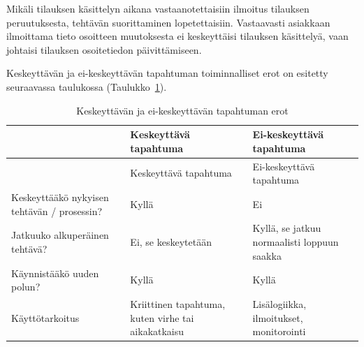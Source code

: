 \documentclass[
  finnish,
  letterpaper,
  DIV=11,
  numbers=noendperiod,
  oneside]{scrreprt}
\begin{document}
Mikäli tilauksen käsittelyn aikana vastaanotettaisiin ilmoitus tilauksen
peruutuksesta, tehtävän suorittaminen lopetettaisiin. Vastaavasti
asiakkaan ilmoittama tieto osoitteen muutoksesta ei keskeyttäisi
tilauksen käsittelyä, vaan johtaisi tilauksen osoitetiedon
päivittämiseen.

Keskeyttävän ja ei-keskeyttävän tapahtuman toiminnalliset erot on
esitetty seuraavassa taulukossa
(Taulukko~\ref{tbl-keskeyttava-tapahtuma}).

\begin{longtable}[]{@{}
  >{\raggedright\arraybackslash}p{}
  >{\raggedright\arraybackslash}p{}
  >{\raggedright\arraybackslash}p{}@{}}
\caption{Keskeyttävän ja ei-keskeyttävän tapahtuman
erot}\label{tbl-keskeyttava-tapahtuma}\tabularnewline
\toprule\noalign{}
\begin{minipage}[b]{\linewidth}\raggedright
\end{minipage} & \begin{minipage}[b]{\linewidth}\raggedright
Keskeyttävä tapahtuma
\end{minipage} & \begin{minipage}[b]{\linewidth}\raggedright
Ei-keskeyttävä tapahtuma
\end{minipage} \\
\midrule\noalign{}
\endfirsthead
\toprule\noalign{}
\begin{minipage}[b]{\linewidth}\raggedright
\end{minipage} & \begin{minipage}[b]{\linewidth}\raggedright
Keskeyttävä tapahtuma
\end{minipage} & \begin{minipage}[b]{\linewidth}\raggedright
Ei-keskeyttävä tapahtuma
\end{minipage} \\
\midrule\noalign{}
\endhead
\bottomrule\noalign{}
\endlastfoot
Keskeyttääkö nykyisen tehtävän / prosessin? & Kyllä & Ei \\
Jatkuuko alkuperäinen tehtävä? & Ei, se keskeytetään & Kyllä, se jatkuu
normaalisti loppuun saakka \\
Käynnistääkö uuden polun? & Kyllä & Kyllä \\
Käyttötarkoitus & Kriittinen tapahtuma, kuten virhe tai aikakatkaisu &
Lisälogiikka, ilmoitukset, monitorointi \\
\end{longtable}
\end{document}
